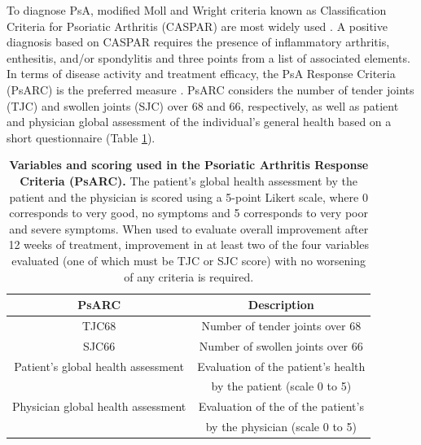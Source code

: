 To diagnose PsA, modified Moll and Wright criteria known as Classification Criteria for Psoriatic Arthritis (CASPAR) are most widely used \parencite {Taylor2006}. A positive diagnosis based on CASPAR requires the presence of inflammatory arthritis, enthesitis, and/or spondylitis and three points from a list of associated elements. In terms of disease activity and treatment efficacy, the PsA Response Criteria (PsARC) is the preferred measure \parencite{Mease2011,Clegg1996}. PsARC considers the number of tender joints (TJC) and swollen joints (SJC) over 68 and 66, respectively, as well as patient and physician global assessment of the individual's general health based on a short questionnaire (Table \ref{tab:PsARC}). 

\begin{table}[htbp]
\setlength{\tabcolsep}{20pt}
\renewcommand{\arraystretch}{1.5}
\begin{tabular}{@{} c c}
\toprule
\textbf{PsARC} & \textbf{Description} \\
\midrule
\midrule
TJC68  & Number of tender joints over 68\\
SJC66  & Number of swollen joints over 66 \\
Patient’s global health assessment  & Evaluation of the patient's health\\
                                    & by the patient (scale 0 to 5)\\
Physician global health assessment  & Evaluation of the of the patient's \\
                                    & by the physician (scale 0 to 5) \\
\bottomrule
\end{tabular}
\medskip %
\caption[Variables and scoring used in the Psoriatic Arthritis Response Criteria (PsARC)]{\textbf{Variables and scoring used in the Psoriatic Arthritis Response Criteria (PsARC).} The patient's global health assessment by the patient and the physician is scored using a 5-point Likert scale, where 0 corresponds to very good, no symptoms and 5 corresponds to very poor and severe symptoms. When used to evaluate overall improvement after 12 weeks of treatment, improvement in at least two of the four variables evaluated (one of which must be TJC or SJC score) with no worsening of any criteria is required.}
\label{tab:PsARC}
\end{table}
\bigskip %



